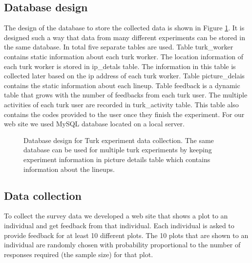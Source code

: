 \documentclass[11pt]{article}
\begin{document}
\subsection{Database design} The design of the database to store the collected data is shown in Figure \ref{fig:turk_database_design}. It is designed such a way that data from many different experiments can be stored in the same database. In total five separate tables are used. Table turk\_worker contains static information about each turk worker. The location information of each turk worker is stored in ip\_detals table. The information in this table is collected later based on the ip address of each turk worker. Table picture\_delais contains the static information about each lineup. Table feedback is a dynamic table that grows with the number of feedbacks from each turk user. The multiple activities of each turk user are recorded in turk\_activity table. This table also contains the codes provided to the user once they finish the experiment. For our web site we used MySQL database located on a local server.

\begin{figure}[hbtp]
   \centering
       \caption{Database design for Turk experiment data collection. The same database can be used for multiple turk experiments by keeping experiment information in picture details table which contains information about the lineups.}
       \label{fig:turk_database_design}
\end{figure}

\subsection{Data collection} To collect the survey data we developed a web site that shows a plot to an individual and get feedback from that individual. Each individual is asked to provide feedback for at least 10 different plots. The 10 plots that are shown to an individual are randomly chosen with probability proportional to the number of responses required (the sample size) for that plot.
\end{document}
